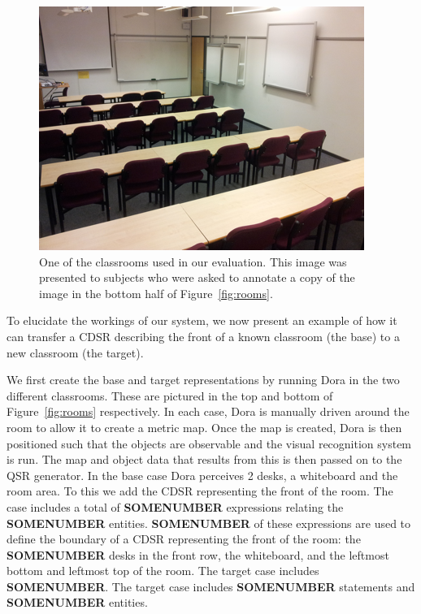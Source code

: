 \documentclass[letterpaper]{article}
\begin{document}
\begin{figure}
  \includegraphics[width=\columnwidth]{images/ug40.png}
  \caption{One of the classrooms used in our evaluation. This image was presented to subjects who were  asked to annotate a copy of the image in the bottom half of Figure~\ref{fig:rooms}.}
  \label{fig:ug40}
\end{figure}



To elucidate the workings of our system, we now present an example of how it can transfer a CDSR describing the front of a known classroom (the base) to a new classroom (the target). 

We first create the base and target representations by running Dora in the two different classrooms. These are pictured in the top and bottom of Figure~\ref{fig:rooms} respectively. In each case, Dora is manually driven around the room to allow it to create a metric map. Once the map is created, Dora is then positioned such that the objects are observable and the visual recognition system is run. The map and object data that results from this is then passed on to the QSR generator. In the base case Dora perceives 2 desks, a whiteboard and the room area. To this we add the CDSR representing the front of the room. The case includes a total of \textbf{SOMENUMBER} expressions relating the \textbf{SOMENUMBER} entities. \textbf{SOMENUMBER} of these expressions are used to define the boundary of a CDSR representing the front of the room: the \textbf{SOMENUMBER} desks in the front row, the whiteboard, and the leftmost bottom and leftmost top of the room. The target case includes \textbf{SOMENUMBER}. The target case includes \textbf{SOMENUMBER} statements and \textbf{SOMENUMBER} entities.
\end{document}
